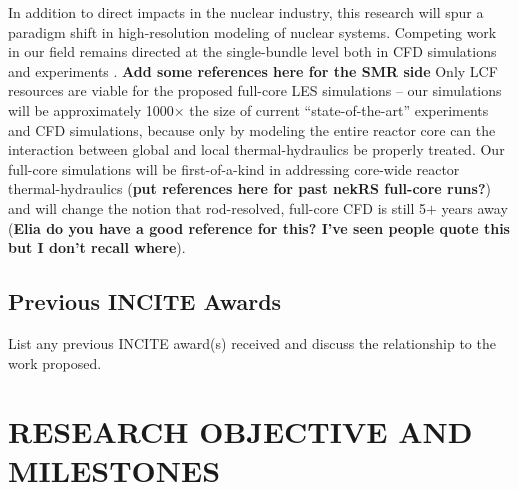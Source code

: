 In addition to direct impacts in the nuclear industry, this research will spur a paradigm shift in high-resolution modeling of nuclear systems. Competing work in our field remains directed at the single-bundle level both in CFD simulations \cite{wang2020,fanning,wang2020b} and experiments \cite{goth,song_2020,martin2020}. {\bf Add some references here for the SMR side} Only LCF resources are viable for the proposed full-core LES simulations -- our simulations will be approximately 1000\(\times\) the size of current ``state-of-the-art'' experiments and CFD simulations, because only by modeling the entire reactor core can the interaction between global and local thermal-hydraulics be properly treated. Our full-core simulations will be first-of-a-kind in addressing core-wide reactor thermal-hydraulics ({\bf put references here for past nekRS full-core runs?}) and will change the notion that rod-resolved, full-core CFD is still 5\(+\) years away ({\bf Elia do you have a good reference for this? I've seen people quote this but I don't recall where}).


\vspace{-.25in}
\subsection{Previous INCITE Awards}
\vspace{-.2in}


List any previous INCITE award(s) received and discuss the relationship to the work proposed. 

\vspace{-.25in}
\section{RESEARCH OBJECTIVE AND MILESTONES} %
\vspace{-.2in}


